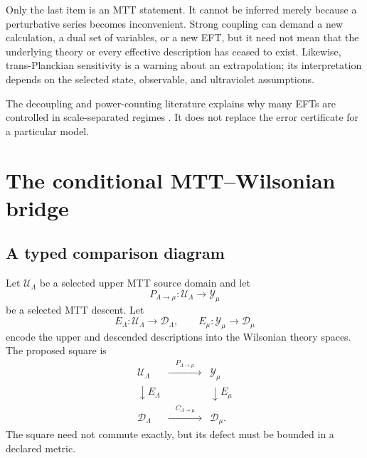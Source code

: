 \documentclass[11pt]{article}
\theoremstyle{definition}
\theoremstyle{remark}
\begin{document}
Only the last item is an MTT statement.  It cannot be inferred merely because
a perturbative series becomes inconvenient.  Strong coupling can demand a
new calculation, a dual set of variables, or a new EFT, but it need not mean
that the underlying theory or every effective description has ceased to
exist.  Likewise, trans-Planckian sensitivity is a warning about an
extrapolation; its interpretation depends on the selected state, observable,
and ultraviolet assumptions.

The decoupling and power-counting literature explains why many EFTs are
controlled in scale-separated regimes
\cite{AppelquistCarazzone1975,Weinberg1979,Georgi1993,Burgess2007}.  It does
not replace the error certificate for a particular model.

\section{The conditional MTT--Wilsonian bridge}
\label{sec:mtt}

\subsection{A typed comparison diagram}

Let \(\mathcal U_\Lambda\) be a selected upper MTT source domain and let
\[
 P_{\Lambda\to\mu}:\mathcal U_\Lambda\to\mathcal Y_\mu
\]
be a selected MTT descent.  Let
\[
 E_\Lambda:\mathcal U_\Lambda\to\mathcal D_\Lambda,
 \qquad
 E_\mu:\mathcal Y_\mu\to\mathcal D_\mu
\]
encode the upper and descended descriptions into the Wilsonian theory
spaces.  The proposed square is
\[
\begin{array}{ccc}
\mathcal U_\Lambda
& \xrightarrow{\quad P_{\Lambda\to\mu}\quad} &
\mathcal Y_\mu
\\[2mm]
\downarrow E_\Lambda && \downarrow E_\mu
\\[2mm]
\mathcal D_\Lambda
& \xrightarrow{\quad C_{\Lambda\to\mu}\quad} &
\mathcal D_\mu .
\end{array}
\]
The square need not commute exactly, but its defect must be bounded in a
declared metric.
\end{document}
